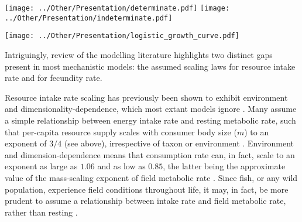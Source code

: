 \documentclass[a4paper]{article} %
\begin{document}
    \begin{center}
        \begin{minipage}{0.48\linewidth}
        \texttt{[image: ../Other/Presentation/determinate.pdf]}
        \texttt{[image: ../Other/Presentation/indeterminate.pdf]}  
        \label{growth_schedules}
        \end{minipage}%
        \hfill
        \begin{minipage}{0.45\linewidth}
            \texttt{[image: ../Other/Presentation/logistic\_growth\_curve.pdf]}  
            \label{logistic_growth}
        \end{minipage}
    \end{center}
    Intriguingly, review of the modelling literature highlights two distinct gaps present in most mechanistic models: the assumed scaling laws for resource intake rate and for fecundity rate.
    
    Resource intake rate scaling has previously been shown to exhibit environment and dimensionality-dependence, which most extant models ignore \autocite{Pawar2012}. Many assume a simple relationship between energy intake rate and resting metabolic rate, such that per-capita resource supply scales with consumer body size ($m$) to an exponent of $3/4$ (see above), irrespective of taxon or environment \autocite{Pawar2012}. Environment and dimension-dependence means that consumption rate can, in fact, scale to an exponent as large as $1.06$ and as low as $0.85$, the latter being the approximate value of the mass-scaling exponent of field metabolic rate \autocite{peters1983,Weibel2004, Pawar2012}. Since fish, or any wild population, experience field conditions throughout life, it may, in fact, be more prudent to assume a relationship between intake rate and field metabolic rate, rather than resting \autocite{Boisclair1993}.
\end{document}
